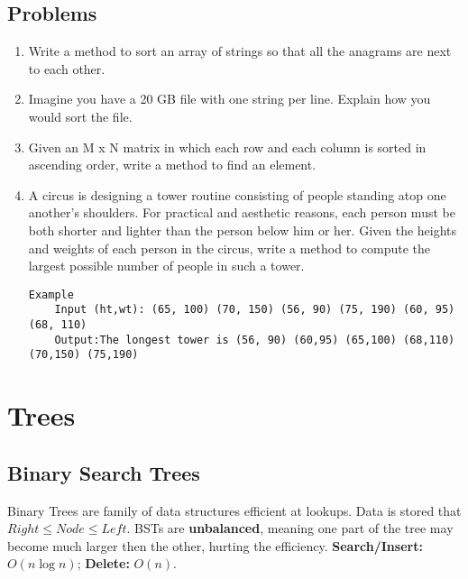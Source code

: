 \documentclass{article}
\begin{document}
	\subsection{Problems}
		\begin{enumerate}
			\item Write a method to sort an array of strings so that all the anagrams are next to each other.
			\item Imagine you have a 20 GB file with one string per line. Explain how you would sort the file.
			\item Given an M x N matrix in which each row and each column is sorted in ascending order, write a method to find an element.
			\item A circus is designing a tower routine consisting of people standing atop one another's shoulders. For practical and aesthetic reasons, each person must be both shorter and lighter than the person below him or her. Given the heights and weights of each person in the circus, write a method to compute the largest possible number of people in such a tower.
				\begin{lstlisting}[style=pseudo]
	Example
	Input (ht,wt): (65, 100) (70, 150) (56, 90) (75, 190) (60, 95) (68, 110)
	Output:The longest tower is (56, 90) (60,95) (65,100) (68,110) (70,150) (75,190)
				\end{lstlisting}
		\end{enumerate}


\clearpage
\section{Trees}

\subsection{Binary Search Trees}
Binary Trees are family of data structures efficient at lookups. Data is stored that $Right \leq Node \leq Left$. BSTs are {\bf unbalanced}, meaning one part of the tree may become much larger then the other, hurting the efficiency. {\bf Search/Insert:} $O(n \log n)$; {\bf Delete:} $O(n)$.

%
\end{document}
